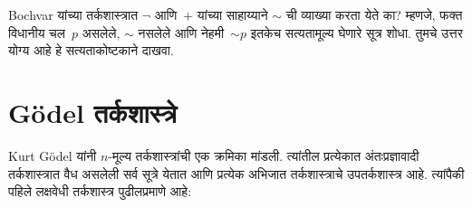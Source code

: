 \begin{prob}
  Bochvar यांच्या तर्कशास्त्रात $\lnot$ आणि~$+$ यांच्या
  साहाय्याने $\sim$ ची व्याख्या करता येते का? म्हणजे, फक्त
  विधानीय चल~$p$ असलेले, $\sim$ नसलेले
  आणि नेहमी~$\mathord{\sim}p$ इतकेच सत्यतामूल्य घेणारे
  सूत्र शोधा. तुमचे उत्तर योग्य आहे हे
  सत्यताकोष्टकाने दाखवा.
\end{prob}













\section{G\"odel तर्कशास्त्रे}\label{mvl:thr:god:sec}

Kurt G\"odel यांनी $n$-मूल्य तर्कशास्त्रांची एक क्रमिका
मांडली. त्यांतील प्रत्येकात अंतःप्रज्ञावादी तर्कशास्त्रात
वैध असलेली सर्व सूत्रे येतात आणि प्रत्येक अभिजात
तर्कशास्त्राचे उपतर्कशास्त्र आहे. त्यांपैकी पहिले
लक्षवेधी तर्कशास्त्र पुढीलप्रमाणे आहे:


